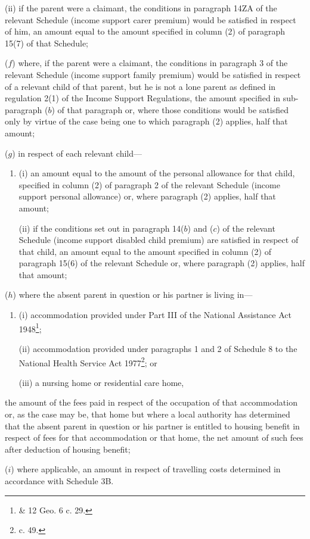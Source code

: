 \documentclass[a4paper]{article}
\begin{document}
\begin{enumerate}
\begin{enumerate}
(ii) if the parent were a claimant, the conditions in paragraph 14ZA of the relevant Schedule (income support carer premium) would be satisfied in respect of him, an amount equal to the amount specified in column (2) of paragraph 15(7) of that Schedule;
\end{enumerate}

($f$) where, if the parent were a claimant, the conditions in paragraph 3 of the relevant Schedule (income support family premium) would be satisfied in respect of a relevant child of that parent, 
but he is not a lone parent as defined in regulation 2(1) of the Income Support Regulations,  %
the amount specified in 
sub-paragraph ($b$) of  %
that paragraph or, where those conditions would be satisfied only by virtue of the case being one to which paragraph (2) applies, half that amount;

($g$) in respect of each relevant child—
\begin{enumerate}\item[]
(i) an amount equal to the amount of the personal allowance for that child, specified in column (2) of paragraph 2 of the relevant Schedule (income support personal allowance) or, where paragraph (2) applies, half that amount;

(ii) if the conditions set out in paragraph 14($b$) and ($c$) of the relevant Schedule (income support disabled child premium) are satisfied in respect of that child, an amount equal to the amount specified in column (2) of paragraph 15(6) of the relevant Schedule or, where paragraph (2) applies, half that amount;
\end{enumerate}

($h$) where the absent parent in question or his partner is living in—
\begin{enumerate}\item[]
(i) accommodation provided under Part III of the National Assistance Act 1948\footnote{ \& 12 Geo. 6 c. 29.};

(ii) accommodation provided under paragraphs 1 and 2 of Schedule 8 to the National Health Service Act 1977\footnote{ c. 49.}; or

(iii) a nursing home or residential care home,
\end{enumerate}
the amount of the fees paid in respect of the occupation of that accommodation or, as the case may be, that home
but where a local authority has determined that the absent parent in question or his partner is entitled to housing benefit in respect of fees for that accommodation or that home, the net amount of such fees after deduction of housing benefit;  %

($i$) where applicable, an amount in respect of travelling costs determined in accordance with Schedule 3B.
\end{enumerate}
\end{document}
